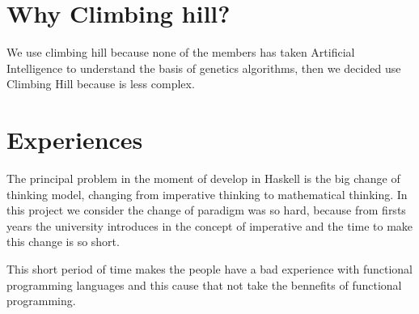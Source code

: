 \section{Why Climbing hill?}
We use climbing hill because none of the members has taken Artificial Intelligence to understand the basis of genetics algorithms, then we decided use Climbing Hill because is less complex.

\section{Experiences}
The principal problem in the moment of develop in Haskell is the big change of thinking model, changing from imperative thinking to mathematical thinking. In this project we consider the change of paradigm was so hard, because from firsts years the university introduces in the concept of imperative and the time to make this change is so short. 

This short period of time makes the people have a bad experience with functional programming languages and this cause that not take the bennefits of functional programming.
